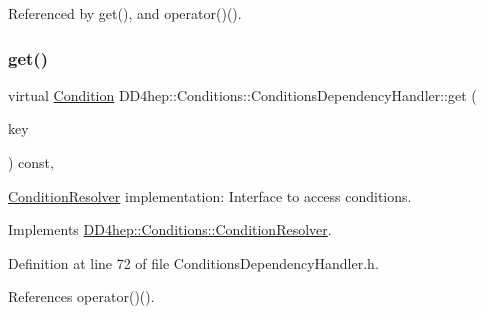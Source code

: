 Referenced by get(), and operator()().

\hypertarget{class_d_d4hep_1_1_conditions_1_1_conditions_dependency_handler_aad2210814936ed6c04fe86b760cfb402}{}\label{class_d_d4hep_1_1_conditions_1_1_conditions_dependency_handler_aad2210814936ed6c04fe86b760cfb402} 
\subsubsection{\texorpdfstring{get()}{get()}\hspace{0.1cm}{\footnotesize\ttfamily [1/2]}}
{\footnotesize\ttfamily virtual \hyperlink{class_d_d4hep_1_1_conditions_1_1_condition}{Condition} D\+D4hep\+::\+Conditions\+::\+Conditions\+Dependency\+Handler\+::get (\begin{DoxyParamCaption}\item[{const \hyperlink{class_d_d4hep_1_1_conditions_1_1_condition_key}{Condition\+Key} \&}]{key }\end{DoxyParamCaption}) const\hspace{0.3cm}{\ttfamily [inline]}, {\ttfamily [virtual]}}



\hyperlink{class_d_d4hep_1_1_conditions_1_1_condition_resolver}{Condition\+Resolver} implementation\+: Interface to access conditions. 



Implements \hyperlink{class_d_d4hep_1_1_conditions_1_1_condition_resolver_a8d33b49336349b3cf4877244572f1827}{D\+D4hep\+::\+Conditions\+::\+Condition\+Resolver}.



Definition at line 72 of file Conditions\+Dependency\+Handler.\+h.



References operator()().

\hypertarget{class_d_d4hep_1_1_conditions_1_1_conditions_dependency_handler_a05c865a8a52716dfabf10101e849182b}{}\label{class_d_d4hep_1_1_conditions_1_1_conditions_dependency_handler_a05c865a8a52716dfabf10101e849182b} 
